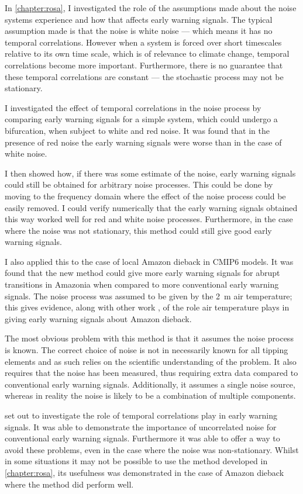 In \cref{chapter:rosa}, I investigated the role of the assumptions made about the noise systems experience and how that affects early warning signals.
The typical assumption made is that the noise is white noise --- which means it has no temporal correlations. However when a system is forced over short timescales relative
to its own time scale, which is of relevance to climate change, temporal correlations become more important. Furthermore, there is no guarantee that these temporal
correlations are constant --- the stochastic process may not be stationary.

I investigated the effect of temporal correlations in the noise process by comparing early warning signals for a simple system, which could undergo a bifurcation, when subject to
white and red noise. It was found that in the presence of red noise the early warning signals were worse than in the case of white noise.

I then showed how, if there was some estimate of the noise, early warning signals could still be obtained for arbitrary noise processes. This could be done by moving to the frequency domain
where the effect of the noise process could be easily removed. I could verify numerically that the early warning signals obtained this way worked well for red and white noise processes.
Furthermore, in the case where the noise was not stationary, this method could still give good early warning signals.

I also applied this to the case of local Amazon dieback in CMIP6 models. It was found that the new method could give more early warning signals for abrupt transitions in Amazonia
when compared to more conventional early warning signals. The noise process was assumed to be given by the \SI{2}{\meter} air temperature; this gives evidence, along with
other work \parencite{Parry2022,Ritchie2022}, of the role air temperature plays in giving early warning signals about Amazon dieback.

The most obvious problem with this method is that it assumes the noise process is known. The correct choice of noise is not in necessarily known for all
tipping elements and as such relies on the scientific understanding of the problem. It also requires that the noise has been measured, thus requiring extra data compared to
conventional early warning signals. Additionally, it assumes a single noise source, whereas in reality the noise is likely to be a combination of multiple components.

 set out to investigate the role of temporal correlations play in early warning signals. It was able to demonstrate the importance of uncorrelated noise
for conventional early warning signals. Furthermore it was able to offer a way to avoid these problems, even in the case where the noise was non-stationary.
Whilst in some situations it may not be possible to use the method developed in \cref{chapter:rosa}, its usefulness was demonstrated in the case of Amazon dieback
where the method did perform well.


